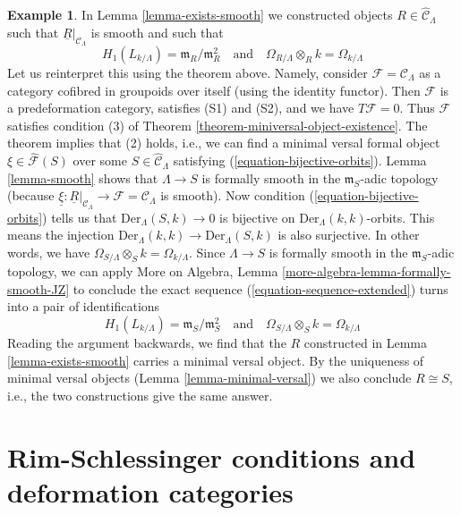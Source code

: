 \documentclass{stacks-project}
\theoremstyle{plain}
\theoremstyle{definition}
\newtheorem{example}[subsection]{Example}
\theoremstyle{remark}
\numberwithin{equation}{subsection}
\begin{document}
\begin{example}
\label{example-smooth-continued}
In Lemma \ref{lemma-exists-smooth} we constructed objects
$R \in \widehat{\mathcal{C}}_\Lambda$ such that
$\underline{R}|_{\mathcal{C}_\Lambda}$ is smooth
and such that
$$
H_1(L_{k/\Lambda}) = \mathfrak m_R/\mathfrak m_R^2
\quad\text{and}\quad
\Omega_{R/\Lambda} \otimes_R k = \Omega_{k/\Lambda}
$$
Let us reinterpret this using the theorem above. Namely,
consider $\mathcal{F} = \mathcal{C}_\Lambda$
as a category cofibred in groupoids over itself
(using the identity functor).
Then $\mathcal{F}$ is a predeformation category,
satisfies (S1) and (S2), and we have $T\mathcal{F} = 0$.
Thus $\mathcal{F}$ satisfies condition (3) of
Theorem \ref{theorem-miniversal-object-existence}.
The theorem implies that (2) holds, i.e.,
we can find a minimal versal formal object
$\xi \in \widehat{\mathcal{F}}(S)$
over some $S \in \widehat{\mathcal{C}}_\Lambda$
satisfying (\ref{equation-bijective-orbits}).
Lemma \ref{lemma-smooth} shows that
$\Lambda \to S$ is formally smooth in the $\mathfrak m_S$-adic
topology (because
$\underline{\xi} : \underline{R}|_{\mathcal{C}_\Lambda} \to
\mathcal{F} = \mathcal{C}_\Lambda$ is smooth).
Now condition (\ref{equation-bijective-orbits})
tells us that $\text{Der}_\Lambda(S, k) \to 0$ is bijective on
$\text{Der}_\Lambda(k, k)$-orbits. This means the injection
$\text{Der}_\Lambda(k, k) \to \text{Der}_\Lambda(S, k)$ is also surjective.
In other words, we have
$\Omega_{S/\Lambda} \otimes_S k = \Omega_{k/\Lambda}$.
Since $\Lambda \to S$ is formally smooth in the $\mathfrak m_S$-adic
topology, we can apply More on Algebra, Lemma
\ref{more-algebra-lemma-formally-smooth-JZ}
to conclude the exact sequence (\ref{equation-sequence-extended})
turns into a pair of identifications
$$
H_1(L_{k/\Lambda}) = \mathfrak m_S/\mathfrak m_S^2
\quad\text{and}\quad
\Omega_{S/\Lambda} \otimes_S k = \Omega_{k/\Lambda}
$$
Reading the argument backwards, we find that the $R$ constructed
in Lemma \ref{lemma-exists-smooth} carries a minimal versal object.
By the uniqueness of minimal versal objects
(Lemma \ref{lemma-minimal-versal})
we also conclude $R \cong S$, i.e., the two constructions give
the same answer.
\end{example}







\section{Rim-Schlessinger conditions and deformation categories}
\label{section-RS-condition}
\end{document}
